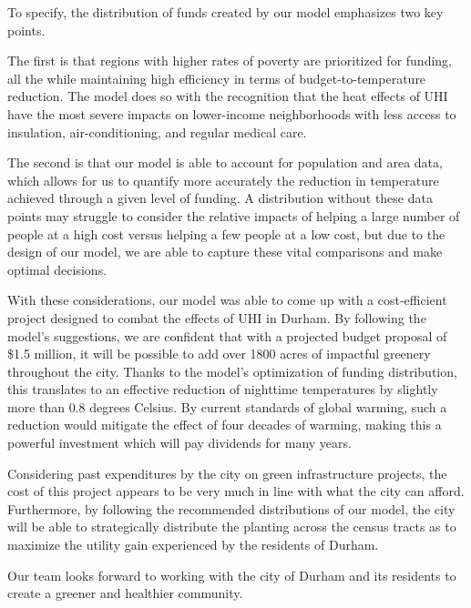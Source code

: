 \documentclass[11pt]{article}
\begin{document}
To specify, the distribution of funds created by our model emphasizes two key points.

The first is that regions with higher rates of poverty are prioritized for funding, all the while maintaining high efficiency in terms of budget-to-temperature reduction. The model does so with the recognition that the heat effects of UHI have the most severe impacts on lower-income neighborhoods with less access to insulation, air-conditioning, and regular medical care.

The second is that our model is able to account for population and area data, which allows for us to quantify more accurately the reduction in temperature achieved through a given level of funding. A distribution without these data points may struggle to consider the relative impacts of helping a large number of people at a high cost versus helping a few people at a low cost, but due to the design of our model, we are able to capture these vital comparisons and make optimal decisions.

With these considerations, our model was able to come up with a cost-efficient project designed to combat the effects of UHI in Durham. By following the model's suggestions, we are confident that with a projected budget proposal of \$1.5 million, it will be possible to add over 1800 acres of impactful greenery throughout the city. Thanks to the model’s optimization of funding distribution, this translates to an effective reduction of nighttime temperatures by slightly more than 0.8 degrees Celsius. By current standards of global warming, such a reduction would mitigate the effect of four decades of warming, making this a powerful investment which will pay dividends for many years.

Considering past expenditures by the city on green infrastructure projects, the cost of this project appears to be very much in line with what the city can afford. Furthermore, by following the recommended distributions of our model, the city will be able to strategically distribute the planting across the census tracts as to maximize the utility gain experienced by the residents of Durham.

Our team looks forward to working with the city of Durham and its residents to create a greener and healthier community. \\


\pagebreak
\printbibliography

\pagebreak
\appendix
\end{document}
